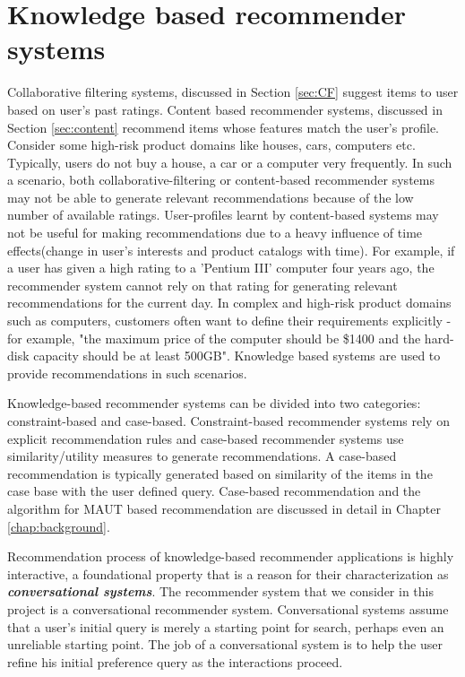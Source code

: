 \section{Knowledge based recommender systems}
Collaborative filtering systems, discussed in Section \ref{sec:CF} suggest items to user based on user's past ratings.
Content based recommender systems, discussed in Section \ref{sec:content} recommend items whose features match the user's profile.
Consider some high-risk product domains like houses, cars, computers etc.
Typically, users do not buy a house, a car or a computer very frequently. 
In such a scenario, both collaborative-filtering or content-based recommender systems may not be able to generate relevant recommendations because of the low number of available ratings.
User-profiles learnt by content-based systems may not be useful for making recommendations due to a heavy influence of time effects(change in user's interests and product catalogs with time). 
For example, if a user has given a high rating to a 'Pentium III' computer four years ago, the recommender system cannot rely on that rating for generating relevant recommendations for the current day.
In complex and high-risk product domains such as computers, customers often want to define their requirements explicitly - for example, "the maximum price of the computer should be \$1400 and the hard-disk capacity should be at least 500GB".
Knowledge based systems are used to provide recommendations in such scenarios.

Knowledge-based recommender systems can be divided into two categories: constraint-based and case-based.
Constraint-based recommender systems rely on explicit recommendation rules and case-based recommender systems use similarity/utility measures to generate recommendations. 
A case-based recommendation is typically generated based on similarity of the items in the case base with the user defined query.
Case-based recommendation and the algorithm for MAUT based recommendation are discussed in detail in Chapter \ref{chap:background}.

Recommendation process of knowledge-based recommender applications is highly interactive, a foundational property that is a reason for their characterization as \textit{\textbf{conversational systems}}. The recommender system that we consider in this project is a conversational recommender system.
Conversational systems assume that a user's initial query is merely a starting point for search, perhaps even an unreliable starting point. The job of a conversational system is to help the user refine his initial preference query as the interactions proceed.
